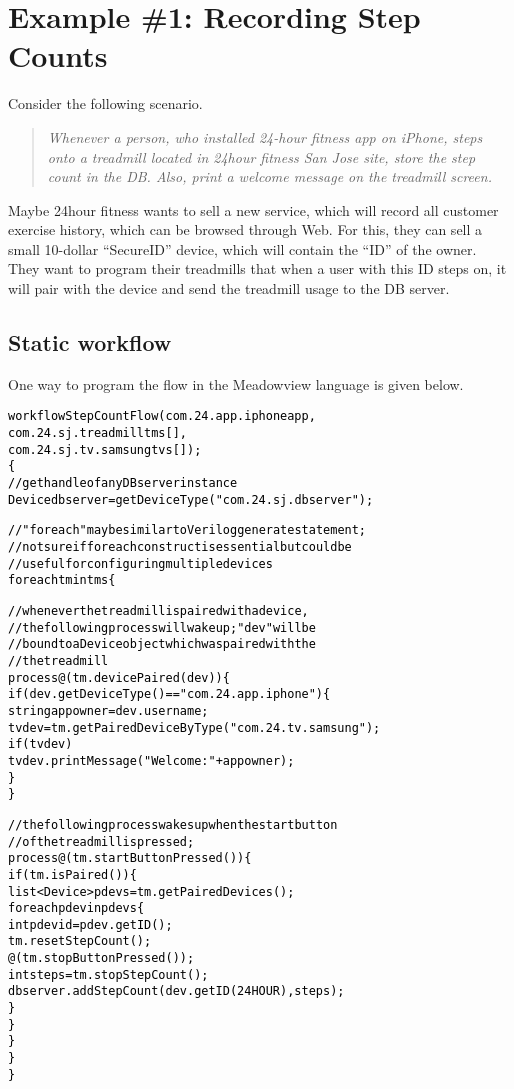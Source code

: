 \documentclass{note}
\begin{document}
\section{Example \#1: Recording Step Counts}
Consider the following scenario.
\begin{quote}
  \textcolor{red2}{\em Whenever a person, who installed 24-hour fitness app on iPhone, steps
    onto a treadmill located in 24hour fitness San Jose site, store the step
    count in the DB. Also, print a welcome message on the treadmill screen.\/} 
\end{quote}
Maybe 24hour fitness wants to sell a new service, which will record all
customer exercise history, which can be browsed through Web. For this, they
can sell a small 10-dollar ``SecureID'' device, which will contain the ``ID''
of the owner. They want to program their treadmills that when a user with this
ID steps on, it will pair with the device and send the treadmill usage to the
DB server. 

\subsection{Static workflow}
One way to program the flow in the Meadowview language is given below.
\begin{alltt}
  \textcolor{black}{workflow StepCountFlow(com.24.app.iphone app,
                         com.24.sj.treadmill tms[],
                         com.24.sj.tv.samsung tvs[]);
  \{
    // get handle of any DB server instance
    Device dbserver = getDeviceType("com.24.sj.dbserver");

    // "foreach" may be similar to Verilog generate statement;
    // not sure if foreach construct is essential but could be
    // useful for configuring multiple devices 
    foreach tm in tms \{
   
      // whenever the treadmill is paired with a device,
      // the following process will wake up; "dev" will be 
      // bound to a Device object which was paired with the
      // the treadmill
      process @(tm.devicePaired(dev)) \{  
        if (dev.getDeviceType() == "com.24.app.iphone") \{
          string appowner = dev.username;
          tvdev = tm.getPairedDeviceByType("com.24.tv.samsung");
          if (tvdev)
            tvdev.printMessage("Welcome: " + appowner);
        \}
      \}

      // the following process wakes up when the start button 
      // of the treadmill is pressed; 
      process @(tm.startButtonPressed()) \{
        if (tm.isPaired()) \{
          list<Device> pdevs = tm.getPairedDevices();
          foreach pdev in pdevs \{
            int pdevid = pdev.getID();
            tm.resetStepCount();
            @(tm.stopButtonPressed());
            int steps = tm.stopStepCount();
            dbserver.addStepCount(dev.getID(24HOUR), steps);
          \}
        \}
      \}
    \}
  \}}
 \end{alltt}
\end{document}

